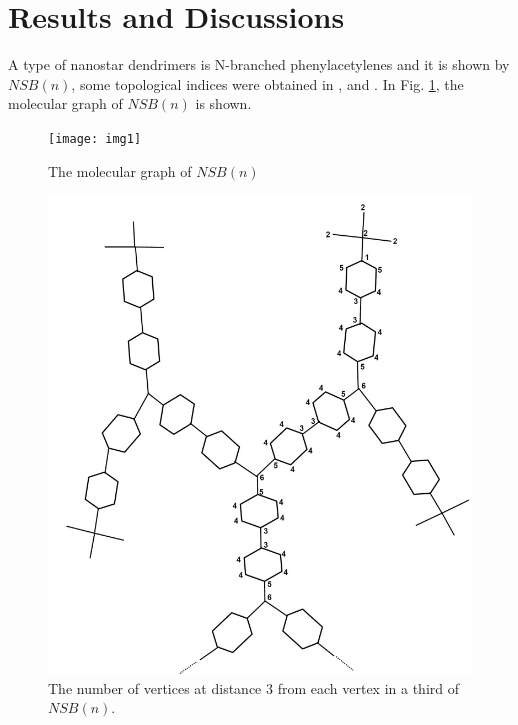 \documentclass[12pt]{article}
\theoremstyle{theorem}
\theoremstyle{defi}
\begin{document}
\section{Results and Discussions}

 A type of nanostar dendrimers is N-branched phenylacetylenes and it is shown by $NSB(n)$, some topological indices were obtained in \cite{21} , \cite{22} and \cite{23}. In Fig. \ref{fig1}, the molecular graph of $NSB(n)$ is shown. 
\begin{figure}
\label{fig1}
\centering
\texttt{[image: img1]}
\caption{The molecular graph of $NSB(n)$}
\end{figure}


\begin{figure}
\label{fig2}
\centering
\includegraphics[width=0.5\linewidth]{img2}
\caption{The number of vertices at distance $3$ from each vertex in a third of $NSB(n)$.}
\end{figure}
\end{document}
